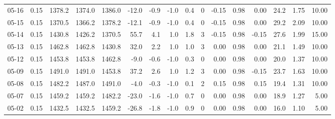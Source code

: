 \begin{threeparttable}
{\begin{tabular}{lrrrrrrrrrrrrrrr}
  05-16 &     0.15 & 1378.2 & 1374.0 & 1386.0 &      -12.0 &           -0.9 &                     -1.0 &                 0.4 &              0 &      -0.15 &      0.98 &           0.00 &             24.2 &            1.75 &                  10.00 \\
  05-15 &     0.15 & 1370.5 & 1366.2 & 1378.2 &      -12.1 &           -0.9 &                     -1.0 &                 0.4 &              0 &      -0.15 &      0.98 &           0.00 &             29.2 &            2.09 &                  10.00 \\
  05-14 &     0.15 & 1430.8 & 1426.2 & 1370.5 &       55.7 &            4.1 &                      1.0 &                 1.8 &              3 &      -0.15 &      0.98 &          -0.15 &             27.6 &            1.99 &                  15.00 \\
  05-13 &     0.15 & 1462.8 & 1462.8 & 1430.8 &       32.0 &            2.2 &                      1.0 &                 1.0 &              3 &       0.00 &      0.98 &           0.00 &             21.1 &            1.49 &                  10.00 \\
  05-12 &     0.15 & 1453.8 & 1453.8 & 1462.8 &       -9.0 &           -0.6 &                     -1.0 &                 0.3 &              0 &       0.00 &      0.98 &           0.00 &             20.0 &            1.37 &                  10.00 \\
  05-09 &     0.15 & 1491.0 & 1491.0 & 1453.8 &       37.2 &            2.6 &                      1.0 &                 1.2 &              3 &       0.00 &      0.98 &          -0.15 &             23.7 &            1.63 &                  10.00 \\
  05-08 &     0.15 & 1482.2 & 1487.0 & 1491.0 &       -4.0 &           -0.3 &                     -1.0 &                 0.1 &              2 &       0.15 &      0.98 &           0.15 &             19.4 &            1.31 &                  10.00 \\
  05-07 &     0.15 & 1459.2 & 1459.2 & 1482.2 &      -23.0 &           -1.6 &                     -1.0 &                 0.7 &              0 &       0.00 &      0.98 &           0.00 &             18.9 &            1.27 &                   5.00 \\
  05-02 &     0.15 & 1432.5 & 1432.5 & 1459.2 &      -26.8 &           -1.8 &                     -1.0 &                 0.9 &              0 &       0.00 &      0.98 &           0.00 &             16.0 &            1.10 &                   5.00 \\

\end{tabular}}
\end{threeparttable}

